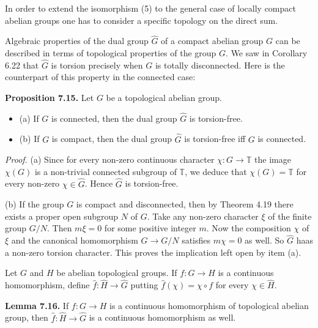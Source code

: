 \documentclass[12pt]{article}
\begin{document}
    In order to extend the isomorphism (5) to the general case of locally compact abelian groups one has to
consider a specific topology on the direct sum.


    Algebraic properties of the dual group $\hat{G}$ of a compact abelian group $G$ can be described in terms of
topological properties of the group $G$. We saw in Corollary 6.22 that $\hat{G}$ is torsion precisely when $G$ is totally
disconnected. Here is the counterpart of this property in the connected case:


\textbf{Proposition 7.15.} Let $G$ be a topological abelian group.


\begin{itemize}

    \item (a) If $G$ is connected, then the dual group $\hat{G}$ is torsion-free.

    \item (b) If $G$ is compact, then the dual group $\hat{G}$ is torsion-free iff $G$ is connected.

\end{itemize}


\emph{Proof.} (a) Since for every non-zero continuous character $\chi : G \to \mathbb{T}$ the image $\chi(G)$ is a non-trivial connected
subgroup of $\mathbb{T}$, we deduce that $\chi(G) = \mathbb{T}$ for every non-zero $\chi \in \hat{G}$. Hence $\hat{G}$ is torsion-free.


    (b) If the group $G$ is compact and disconnected, then by Theorem 4.19 there exists a proper open subgroup
$N$ of $G$. Take any non-zero character $\xi$ of the finite group $G/N$. Then $m \xi = 0$ for some positive integer $m$.
Now the composition $\chi$ of $\xi$ and the canonical homomorphism $G \to G/N$ satisfies $m\chi = 0$ as well. So $\hat{G}$ haas a
non-zero torsion character. This proves the implication left open by item (a).


    Let $G$ and $H$ be abelian topological groups. If $f : G \to H$ is a continuous homomorphism, define $\hat{f}: \hat{H} \to \hat{G}$
putting $\hat{f}(\chi) = \chi \circ f$ for every $\chi \in \hat{H}$.


\textbf{Lemma 7.16.} If $f:G \to H$ is a continuous homomorphism of topological abelian group, then $\hat{f} : \hat{H} \to \hat{G}$ is
a continuous homomorphism as well.
\end{document}
